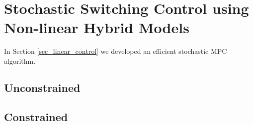 \section{Stochastic Switching Control using Non-linear Hybrid Models}
\label{sec_spf_control}
In Section \ref{sec_linear_control} we developed an efficient stochastic MPC algorithm. 


\subsection{Unconstrained}

\subsection{Constrained} 

